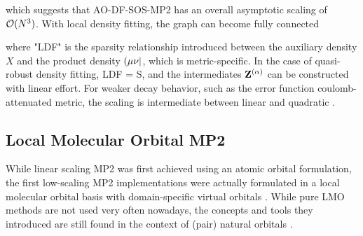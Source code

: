 \noindent which suggests that AO-DF-SOS-MP2 has an overall asymptotic scaling of $\mathcal{O}(N^{3})$. With local density fitting, the graph can become fully connected
\begin{center}
\end{center}

\noindent where "LDF" is the sparsity relationship introduced between the auxiliary density $X$ and the product density $\left( \mu\nu \right\rvert$, which is metric-specific. In the case of quasi-robust density fitting, LDF = S, and the intermediates $\mathbf{Z}^{(\alpha)}$ can be constructed with linear effort. For weaker decay behavior, such as the error function coulomb-attenuated metric, the scaling is intermediate between linear and quadratic \cite{Gla2020}. 


\subsection{Local Molecular Orbital MP2}

While linear scaling MP2 was first achieved using an atomic orbital formulation, the first low-scaling MP2 implementations were actually formulated in a local molecular orbital basis with domain-specific virtual orbitals \cite{Pul1983,Sae1985,Pul1986,Sae1987,Sae1988}. While pure LMO methods are not used very often nowadays, the concepts and tools they introduced are still found in the context of (pair) natural orbitals \cite{Pin2018}.
